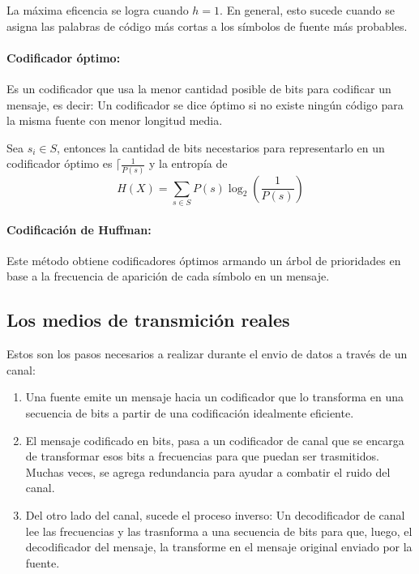 \documentclass[10pt,a4paper]{article}
\begin{document}
La máxima eficencia se logra cuando \(h = 1\). En general, esto sucede cuando se asigna las palabras de código más cortas a los símbolos de fuente más probables.

\paragraph{Codificador óptimo:} Es un codificador que usa la menor cantidad posible de bits para codificar un mensaje, es decir: Un codificador se dice óptimo si no existe ningún código para la misma fuente con menor longitud media.

Sea \(s_i\in S\), entonces la cantidad de bits necestarios para representarlo en un codificador óptimo es \(\lceil\frac{1}{P(s)}\) y la entropía de \[H(X) = \sum_{s\in S} P(s)\log_2\left(\frac{1}{P(s)}\right)\]

\paragraph{Codificación de Huffman:} Este método obtiene codificadores óptimos armando un árbol de prioridades en base a la frecuencia de aparición de cada símbolo en un mensaje.

\subsection{Los medios de transmición reales}
Estos son los pasos necesarios a realizar durante el envio de datos a través de un canal:
\begin{enumerate}
  \item Una fuente emite un mensaje hacia un codificador que lo transforma en una secuencia de bits a partir de una codificación idealmente eficiente.
  \item El mensaje codificado en bits, pasa a un codificador de canal que se encarga de transformar esos bits a frecuencias para que puedan ser trasmitidos. Muchas veces, se agrega redundancia para ayudar a combatir el ruido del canal.
  \item Del otro lado del canal, sucede el proceso inverso: Un decodificador de canal lee las frecuencias y las trasnforma a una secuencia de bits para que, luego, el decodificador del mensaje, la transforme en el mensaje original enviado por la fuente.
\end{enumerate}
\end{document}
